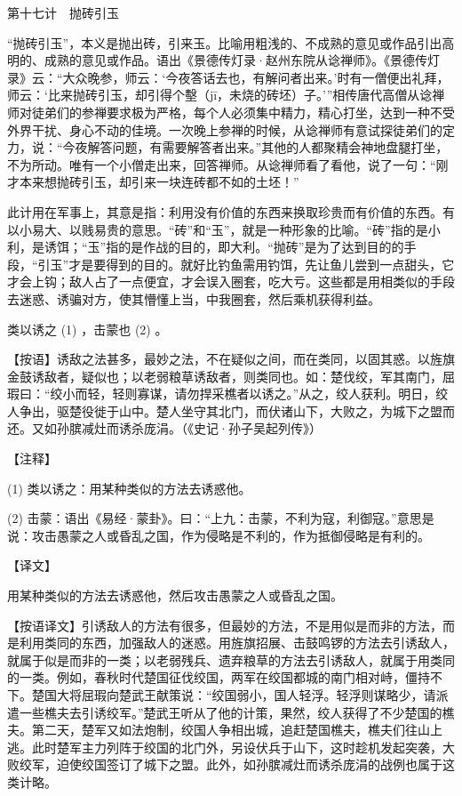 \documentclass[12pt,UTF8]{ctexbook}
\begin{document}
第十七计　抛砖引玉


“抛砖引玉”，本义是抛出砖，引来玉。比喻用粗浅的、不成熟的意见或作品引出高明的、成熟的意见或作品。语出《景德传灯录·赵州东院从谂禅师》。《景德传灯录》云：“大众晚参，师云：‘今夜答话去也，有解问者出来。’时有一僧便出礼拜，师云：‘比来抛砖引玉，却引得个墼（jī，未烧的砖坯）子。’”相传唐代高僧从谂禅师对徒弟们的参禅要求极为严格，每个人必须集中精力，精心打坐，达到一种不受外界干扰、身心不动的佳境。一次晚上参禅的时候，从谂禅师有意试探徒弟们的定力，说：“今夜解答问题，有需要解答者出来。”其他的人都聚精会神地盘腿打坐，不为所动。唯有一个小僧走出来，回答禅师。从谂禅师看了看他，说了一句：“刚才本来想抛砖引玉，却引来一块连砖都不如的土坯！”

此计用在军事上，其意是指：利用没有价值的东西来换取珍贵而有价值的东西。有以小易大、以贱易贵的意思。“砖”和“玉”，就是一种形象的比喻。“砖”指的是小利，是诱饵；“玉”指的是作战的目的，即大利。“抛砖”是为了达到目的的手段，“引玉”才是要得到的目的。就好比钓鱼需用钓饵，先让鱼儿尝到一点甜头，它才会上钩；敌人占了一点便宜，才会误入圈套，吃大亏。这些都是用相类似的手段去迷惑、诱骗对方，使其懵懂上当，中我圈套，然后乘机获得利益。





类以诱之 (1) ，击蒙也 (2) 。

【按语】诱敌之法甚多，最妙之法，不在疑似之间，而在类同，以固其惑。以旌旗金鼓诱敌者，疑似也；以老弱粮草诱敌者，则类同也。如：楚伐绞，军其南门，屈瑕曰：“绞小而轻，轻则寡谋，请勿捍采樵者以诱之。”从之，绞人获利。明日，绞人争出，驱楚役徙于山中。楚人坐守其北门，而伏诸山下，大败之，为城下之盟而还。又如孙膑减灶而诱杀庞涓。（《史记·孙子吴起列传》）





【注释】


(1) 类以诱之：用某种类似的方法去诱惑他。

(2) 击蒙：语出《易经·蒙卦》。曰：“上九：击蒙，不利为寇，利御寇。”意思是说：攻击愚蒙之人或昏乱之国，作为侵略是不利的，作为抵御侵略是有利的。





【译文】


用某种类似的方法去诱惑他，然后攻击愚蒙之人或昏乱之国。

【按语译文】引诱敌人的方法有很多，但最妙的方法，不是用似是而非的方法，而是利用类同的东西，加强敌人的迷惑。用旌旗招展、击鼓鸣锣的方法去引诱敌人，就属于似是而非的一类；以老弱残兵、遗弃粮草的方法去引诱敌人，就属于用类同的一类。例如，春秋时代楚国征伐绞国，两军在绞国都城的南门相对峙，僵持不下。楚国大将屈瑕向楚武王献策说：“绞国弱小，国人轻浮。轻浮则谋略少，请派遣一些樵夫去引诱绞军。”楚武王听从了他的计策，果然，绞人获得了不少楚国的樵夫。第二天，楚军又如法炮制，绞国人争相出城，追赶楚国樵夫，樵夫们往山上逃。此时楚军主力列阵于绞国的北门外，另设伏兵于山下，这时趁机发起突袭，大败绞军，迫使绞国签订了城下之盟。此外，如孙膑减灶而诱杀庞涓的战例也属于这类计略。
\end{document}
